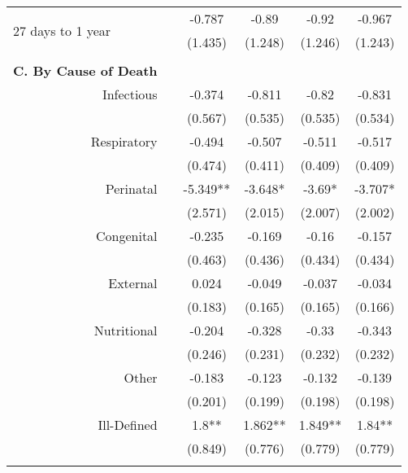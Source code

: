 \begin{table}[H]
\begin{footnotesize}
\begin{center}
{\begin{threeparttable}[b]
\begin{tabular}{rrcccc}
    \multicolumn{1}{l}{\multirow{2}[0]{*}{27 days to 1 year}} &       & -0.787 & -0.89 & -0.92 & -0.967 \\
          &       & (1.435) & (1.248) & (1.246) & (1.243) \\
          &       &       &       &       &  \\
    \midrule
    \multicolumn{1}{p{15.145em}}{\textbf{C. By Cause of Death}} &       &       &       &       &  \\
    \multicolumn{1}{p{15.145em}}{Infectious} &       & -0.374 & -0.811 & -0.82 & -0.831 \\
          &       & (0.567) & (0.535) & (0.535) & (0.534) \\
    \multicolumn{1}{p{15.145em}}{Respiratory} &       & -0.494 & -0.507 & -0.511 & -0.517 \\
          &       & (0.474) & (0.411) & (0.409) & (0.409) \\
    \multicolumn{1}{p{15.145em}}{Perinatal} &       & -5.349** & -3.648* & -3.69* & -3.707* \\
          &       & (2.571) & (2.015) & (2.007) & (2.002) \\
    \multicolumn{1}{p{15.145em}}{Congenital} &       & -0.235 & -0.169 & -0.16 & -0.157 \\
          &       & (0.463) & (0.436) & (0.434) & (0.434) \\
    \multicolumn{1}{p{15.145em}}{External} &       & 0.024 & -0.049 & -0.037 & -0.034 \\
          &       & (0.183) & (0.165) & (0.165) & (0.166) \\
    \multicolumn{1}{p{15.145em}}{Nutritional} &       & -0.204 & -0.328 & -0.33 & -0.343 \\
          &       & (0.246) & (0.231) & (0.232) & (0.232) \\
    \multicolumn{1}{p{15.145em}}{Other} &       & -0.183 & -0.123 & -0.132 & -0.139 \\
          &       & (0.201) & (0.199) & (0.198) & (0.198) \\
    \multicolumn{1}{p{15.145em}}{Ill-Defined} &       & 1.8** & 1.862** & 1.849** & 1.84** \\
          &       & (0.849) & (0.776) & (0.779) & (0.779) \\
          &       &       &       &       &  \\
    \bottomrule
    \bottomrule
    \end{tabular}%
    
    
  \label{table:imr}%

\end{threeparttable}
}
\end{center}
\end{footnotesize}
\end{table}
